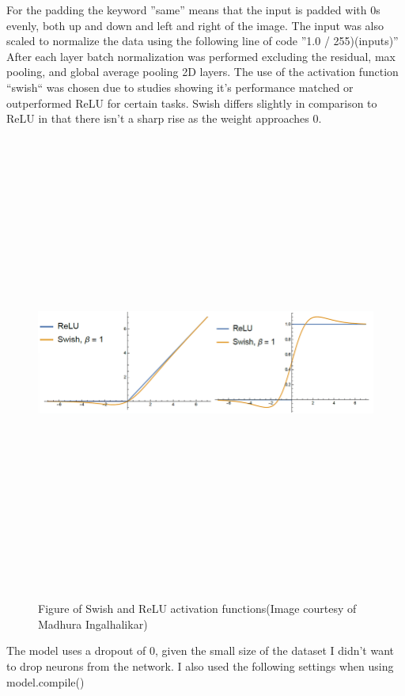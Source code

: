 For the padding the keyword ''same'' means that the input is padded with 0s evenly, both up and down and left and right of the image. The input was also scaled to normalize the data using the following line of code ''1.0 / 255)(inputs)''  After each layer batch normalization was performed excluding the residual, max pooling, and global average pooling 2D layers.  The use of the activation function ``swish`` was chosen due to studies showing it's performance matched or outperformed ReLU for certain tasks\cite{swishAndRelu}. Swish differs slightly in comparison to ReLU in that there isn't a sharp rise as the weight approaches 0. 
 \begin{figure}[H]
    \centering
    \includegraphics[width=1\textwidth,height=15cm,keepaspectratio]{Images/Swish ReLU activations.PNG}\\
    \caption{Figure of Swish and ReLU activation functions(Image courtesy of Madhura Ingalhalikar)\cite{swishReluDiagram}}
    \label{fig:Figure of Swish and ReLU activation functions}
\end{figure}
The model uses a dropout of 0, given the small size of the dataset I didn't want to drop neurons from the network. I also used the following settings when using model.compile() 
